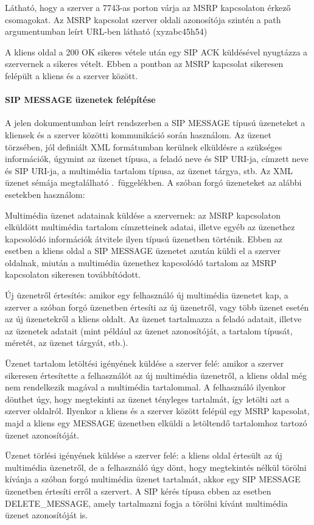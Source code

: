 Látható, hogy a szerver a 7743-as porton várja az MSRP kapcsolaton érkező csomagokat. Az MSRP kapcsolat szerver oldali azonosítója szintén a path argumentumban leírt URL-ben látható (xyzabc45h54)

A kliens oldal a 200 OK sikeres vétele után egy SIP ACK küldésével nyugtázza a szervernek a sikeres vételt. Ebben a pontban az MSRP kapcsolat sikeresen felépült a kliens és a szerver között.

\paragraph{SIP MESSAGE üzenetek felépítése\\}
\label{sec:sip_message}

A jelen dokumentumban leírt rendszerben a SIP MESSAGE típusú üzeneteket a kliensek és a szerver közötti kommunikáció során használom. Az üzenet törzsében, jól definiált XML formátumban kerülnek elküldésre a szükséges információk, úgymint az üzenet típusa, a feladó neve és SIP URI-ja, címzett neve és SIP URI-ja, a multimédia tartalom típusa, az üzenet tárgya, stb. Az XML üzenet sémája megtalálható .~függelékben. A szóban forgó üzeneteket az alábbi esetekben használom:
\begin{mydescription}
\item[Multimédia üzenet adatainak küldése a szervernek:] az MSRP kapcsolaton elküldött multimédia tartalom címzetteinek adatai, illetve egyéb az üzenethez kapcsolódó információk átvitele ilyen típusú üzenetben történik. Ebben az esetben a kliens oldal a SIP MESSAGE üzenetet azután küldi el a szerver oldalnak, miután a multimédia üzenethez kapcsolódó tartalom az MSRP kapcsolaton sikeresen továbbítódott.
\item[Új üzenetről értesítés:] amikor egy felhasználó új multimédia üzenetet kap, a szerver a szóban forgó üzenetben értesíti az új üzenetről, vagy több üzenet esetén az új üzenetekről a kliens oldalt. Az üzenet tartalmazza a feladó adatait, illetve az üzenetek adatait (mint például az üzenet azonosítóját, a tartalom típusát, méretét, az üzenet tárgyát, stb.).
\item[Üzenet tartalom letöltési igényének küldése a szerver felé:] amikor a szerver sikeresen értesítette a felhasználót az új multimédia üzenetről, a kliens oldal még nem rendelkezik magával a multimédia tartalommal. A felhasználó ilyenkor dönthet úgy, hogy megtekinti az üzenet tényleges tartalmát, így letölti azt a szerver oldalról. Ilyenkor a kliens és a szerver között felépül egy MSRP kapcsolat, majd a kliens egy MESSAGE üzenetben elküldi a letöltendő tartalomhoz tartozó üzenet azonosítóját.
\item[Üzenet törlési igényének küldése a szerver felé:] a kliens oldal értesült az új multimédia üzenetről, de a felhasználó úgy dönt, hogy megtekintés nélkül törölni kívánja a szóban forgó multimédia üzenet tartalmát, akkor egy SIP MESSAGE üzenetben értesíti erről a szervert. A SIP kérés típusa ebben az esetben DELETE\_MESSAGE, amely tartalmazni fogja a törölni kívánt multimédia üzenet azonosítóját is.

\end{mydescription}

